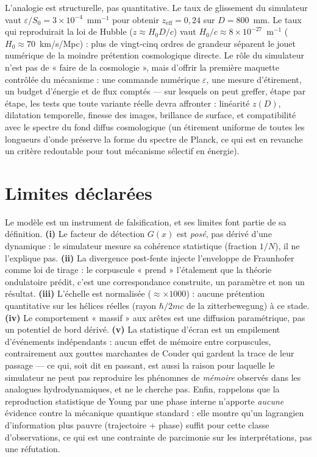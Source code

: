L'analogie est structurelle, pas quantitative. Le taux de glissement du
simulateur vaut $\varepsilon/S_0 = 3\times10^{-4}$~mm$^{-1}$ pour obtenir
$z_{\mathrm{eff}} = 0{,}24$ sur $D = 800$~mm. Le taux qui reproduirait la loi de
Hubble ($z \approx H_0 D/c$) vaut $H_0/c \approx 8\times10^{-27}$~m$^{-1}$
($H_0 \approx 70$~km/s/Mpc) : plus de vingt-cinq ordres de grandeur séparent le jouet
numérique de la moindre prétention cosmologique directe. Le rôle du simulateur
n'est pas de « faire de la cosmologie », mais d'offrir la première maquette
contrôlée du mécanisme : une commande numérique $\varepsilon$, une mesure
d'étirement, un budget d'énergie et de flux comptés --- sur lesquels on peut
greffer, étape par étape, les tests que toute variante réelle devra affronter :
linéarité $z(D)$, dilatation temporelle, finesse des images, brillance de
surface, et compatibilité avec le spectre du fond diffus cosmologique (un
étirement uniforme de toutes les longueurs d'onde préserve la forme du spectre
de Planck, ce qui est en revanche un critère redoutable pour tout mécanisme
sélectif en énergie).

\section{Limites déclarées}\label{sec:limites}

Le modèle est un instrument de falsification, et ses limites font partie de sa
définition. \textbf{(i)} Le facteur de détection $G(x)$ est \emph{posé},
pas dérivé d'une dynamique : le simulateur mesure sa cohérence statistique
(fraction $1/N$), il ne l'explique pas. \textbf{(ii)} La divergence post-fente
injecte l'enveloppe de Fraunhofer comme loi de tirage : le corpuscule « prend »
l'étalement que la théorie ondulatoire prédit, c'est une correspondance
construite, un paramètre et non un résultat. \textbf{(iii)} L'échelle est
normalisée ($\approx\times1000$) : aucune prétention quantitative sur les hélices
réelles (rayon $\hbar/2mc$ de la zitterbewegung) à ce stade. \textbf{(iv)} Le
comportement « massif » aux arêtes est une diffusion paramétrique, pas un
potentiel de bord dérivé. \textbf{(v)} La statistique d'écran est un empilement
d'événements indépendants : aucun effet de mémoire entre corpuscules,
contrairement aux gouttes marchantes de Couder qui gardent la trace de leur
passage \cite{couder2006,bush2015} --- ce qui, soit dit en passant, est aussi la
raison pour laquelle le simulateur ne peut pas reproduire les phénomnes de
\emph{mémoire} observés dans les analogues hydrodynamiques, et ne le cherche pas.
Enfin, rappelons que la reproduction statistique de Young par une phase interne
n'apporte \emph{aucune} évidence contre la mécanique quantique standard : elle
montre qu'un lagrangien d'information plus pauvre (trajectoire + phase) suffit
pour cette classe d'observations, ce qui est une contrainte de parcimonie sur les
interprétations, pas une réfutation.

